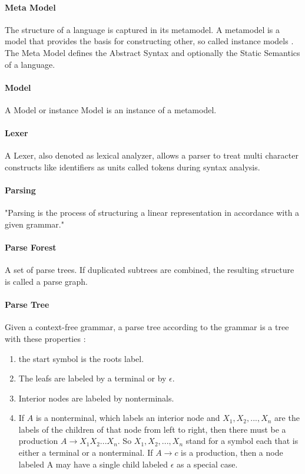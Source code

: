 \paragraph{Meta Model} The structure of a language is captured in its metamodel. A metamodel is a model that provides the basis for constructing other, so called instance models \cite{EMP}. The Meta Model defines the Abstract Syntax and optionally the Static Semantics of a language. \cite{MDSD}

\paragraph{Model} A Model or instance Model is an instance of a metamodel.


\paragraph{Lexer}
A Lexer, also denoted as lexical analyzer, allows a parser to treat multi character constructs like identifiers as units called tokens during syntax analysis. \cite{DragonBook}




\paragraph{Parsing} 
"Parsing is the process of structuring a linear representation in accordance with a given grammar." \cite{ParserBook}

\paragraph{Parse Forest} 
A set of parse trees. If duplicated subtrees are combined, the resulting structure is called a parse graph. \cite{ParserBook}

\paragraph{Parse Tree}
Given a context-free grammar, a parse tree according to the grammar is a tree with these properties \cite{DragonBook}:
\begin{enumerate}
	\item the start symbol is the roots label.
	\item The leafs are labeled by a terminal or by $\epsilon$.
	\item Interior nodes are labeled by nonterminals.
	\item If $A$ is a nonterminal, which labels an interior node and $X_1, X_2, . . . , X_n$ are the labels of the children of that node from left to right, then there must be a production $A  \rightarrow X_1X_2 ... X_n$. So $X_1, X_2, ... , X_n$ stand for a symbol each that is either a terminal or a nonterminal. If $A\rightarrow c$ is a production, then a node labeled A may have a single child labeled $\epsilon$ as a special case. 
\end{enumerate}
